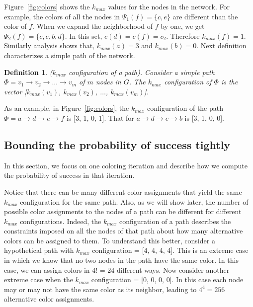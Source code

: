 \documentclass{ws-procs11x85}
\newtheorem{define}{Definition}
\begin{document}
Figure~\ref{fig:colors} shows the $k_{max}$ values for the nodes in
the network. For example, the colors of all the nodes in $\Psi_1(f) =
\{c, e\}$ are different than the color of $f$. When we expand the
neighborhood of $f$ by one, we get $\Psi_2(f) = \{c, e, b, d\}$. In
this set, $c(d) = c(f) = c_2$.  Therefore $k_{max}(f) = 1$.  Similarly
analysis shows that, $k_{max}(a) = 3$ and $k_{max}(b) = 0$. Next
definition characterizes a simple path of the network.

\begin{define} {\sc ($k_{max}$ configuration of a path)}.  Consider a
  simple path $\Phi = v_1 \rightarrow v_2 \rightarrow \ldots
  \rightarrow v_m$ of $m$ nodes in $G$. The $k_{max}$ configuration of
  $\Phi$ is the vector [$k_{max}(v_1)$, $k_{max}(v_2)$, $\ldots$,
  $k_{max}(v_m)$].
\end{define}

As an example, in Figure~\ref{fig:colors}, the $k_{max}$ configuration
of the path $\Phi = a \rightarrow d \rightarrow e \rightarrow f$ is
[3, 1, 0, 1]. That for $a \rightarrow d \rightarrow e \rightarrow b$ is
[3, 1, 0, 0].



\subsection{Bounding the probability of success tightly}

In this section, we focus on one coloring iteration and describe how
we compute the probability of success in that iteration.
  
Notice that there can be many different color assignments that yield
the same $k_{max}$ configuration for the same path. Also, as we will
show later, the number of possible color assignments to the nodes of a
path can be different for different $k_{max}$ configurations. Indeed,
the $k_{max}$ configuration of a path describes the constraints
imposed on all the nodes of that path about how many alternative
colors can be assigned to them. To understand this better, consider a
hypothetical path with $k_{max}$ configuration = [4, 4, 4, 4]. This is
an extreme case in which we know that no two nodes in the path have
the same color. In this case, we can assign colors in 4! = 24
different ways.  Now consider another extreme case when the $k_{max}$
configuration = [0, 0, 0, 0]. In this case each node may or may not
have the same color as its neighbor, leading to $4^4 =256$ alternative
color assignments.
\end{document}
